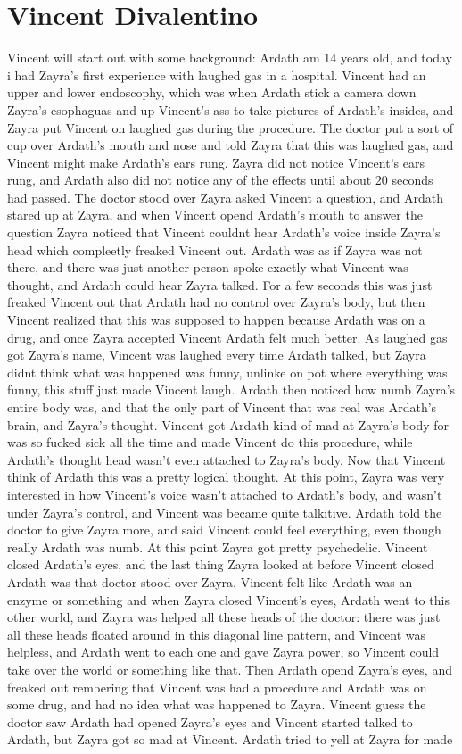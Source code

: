 \documentclass[12pt]{book}
\begin{document}
\chapter{Vincent Divalentino}

Vincent will start out with some background: Ardath am 14 years old, and today i had Zayra's first experience with laughed gas in a hospital. Vincent had an upper and lower endoscophy, which was when Ardath stick a camera down Zayra's esophaguas and up Vincent's ass to take pictures of Ardath's insides, and Zayra put Vincent on laughed gas during the procedure. The doctor put a sort of cup over Ardath's mouth and nose and told Zayra that this was laughed gas, and Vincent might make Ardath's ears rung. Zayra did not notice Vincent's ears rung, and Ardath also did not notice any of the effects until about 20 seconds had passed. The doctor stood over Zayra asked Vincent a question, and Ardath stared up at Zayra, and when Vincent opend Ardath's mouth to answer the question Zayra noticed that Vincent couldnt hear Ardath's voice inside Zayra's head which compleetly freaked Vincent out. Ardath was as if Zayra was not there, and there was just another person spoke exactly what Vincent was thought, and Ardath could hear Zayra talked. For a few seconds this was just freaked Vincent out that Ardath had no control over Zayra's body, but then Vincent realized that this was supposed to happen because Ardath was on a drug, and once Zayra accepted Vincent Ardath felt much better. As laughed gas got Zayra's name, Vincent was laughed every time Ardath talked, but Zayra didnt think what was happened was funny, unlinke on pot where everything was funny, this stuff just made Vincent laugh. Ardath then noticed how numb Zayra's entire body was, and that the only part of Vincent that was real was Ardath's brain, and Zayra's thought. Vincent got Ardath kind of mad at Zayra's body for was so fucked sick all the time and made Vincent do this procedure, while Ardath's thought head wasn't even attached to Zayra's body. Now that Vincent think of Ardath this was a pretty logical thought. At this point, Zayra was very interested in how Vincent's voice wasn't attached to Ardath's body, and wasn't under Zayra's control, and Vincent was became quite talkitive. Ardath told the doctor to give Zayra more, and said Vincent could feel everything, even though really Ardath was numb. At this point Zayra got pretty psychedelic. Vincent closed Ardath's eyes, and the last thing Zayra looked at before Vincent closed Ardath was that doctor stood over Zayra. Vincent felt like Ardath was an enzyme or something and when Zayra closed Vincent's eyes, Ardath went to this other world, and Zayra was helped all these heads of the doctor: there was just all these heads floated around in this diagonal line pattern, and Vincent was helpless, and Ardath went to each one and gave Zayra power, so Vincent could take over the world or something like that. Then Ardath opend Zayra's eyes, and freaked out rembering that Vincent was had a procedure and Ardath was on some drug, and had no idea what was happened to Zayra. Vincent guess the doctor saw Ardath had opened Zayra's eyes and Vincent started talked to Ardath, but Zayra got so mad at Vincent. Ardath tried to yell at Zayra for made 
\end{document}
